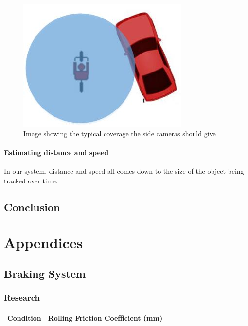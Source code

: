 \documentclass[a4paper]{report}
\begin{document}
{\begin{figure}[H]
\centering
\includegraphics[scale=0.6]{figures/final_design/bicycle_safe_zone}
\caption{Image showing the typical coverage the side cameras should give}
\label{fig:safe_zone}
\end{figure}

\subsection{Estimating distance and speed}
In our system, distance and speed all comes down to the size of the object being tracked over time. 





\chapter{Conclusion}

\part*{Appendices}

\appendix
\chapter{Braking System}
\section{Research}

\begin{table}[h]

    \begin{tabular}{ | c | c |}
    \hline
    \textbf{Condition} & \textbf{Rolling Friction Coefficient (mm)} \\ \hline
   

\end{tabular}
\end{table}}
\end{document}

